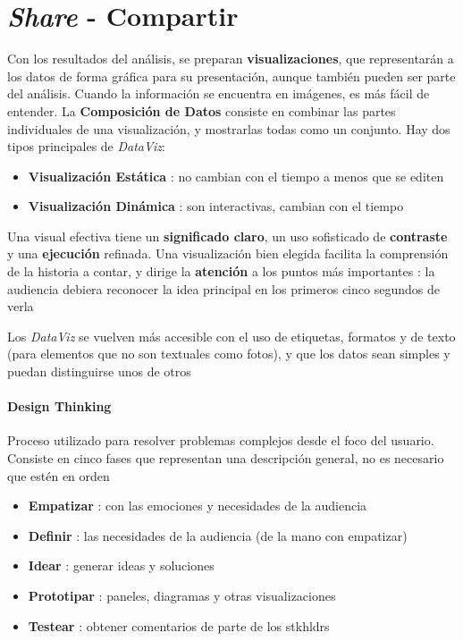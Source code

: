 
\section{\textit{Share} - Compartir}
Con los resultados del análisis, se preparan \textbf{visualizaciones}, que representarán a los datos de forma gráfica para su presentación, aunque también pueden ser parte del análisis. Cuando la información se encuentra en imágenes, es más fácil de entender. La \textbf{Composición de Datos} consiste en combinar las partes individuales de una visualización, y mostrarlas todas como un conjunto. Hay dos tipos principales de \textit{DataViz}:
\begin{itemize}
    \item {\textbf{Visualización Estática} : no cambian con el tiempo a menos que se editen}
    \item {\textbf{Visualización Dinámica} : son interactivas, cambian con el tiempo}
\end{itemize}
Una visual efectiva tiene un \textbf{significado claro}, un uso sofisticado de \textbf{contraste} y una \textbf{ejecución} refinada. Una visualización bien elegida facilita la comprensión de la historia a contar, y dirige la \textbf{atención} a los puntos más importantes : la audiencia debiera reconocer la idea principal en los primeros cinco segundos de verla

Los \textit{DataViz} se vuelven más accesible con el uso de etiquetas, formatos y de texto (para elementos que no son textuales como fotos), y que los datos sean simples y puedan distinguirse unos de otros

\paragraph{Design Thinking}
Proceso utilizado para resolver problemas complejos desde el foco del usuario. Consiste en cinco fases que representan una descripción general, no es necesario que estén en orden
\begin{itemize}
    \item {\textbf{Empatizar} : con las emociones y necesidades de la audiencia}
    \item {\textbf{Definir} : las necesidades de la audiencia (de la mano con empatizar)}
    \item {\textbf{Idear} : generar ideas y soluciones} 
    \item {\textbf{Prototipar} : paneles, diagramas y otras visualizaciones}
    \item {\textbf{Testear} : obtener comentarios de parte de los \gls{stkhldrs}}
\end{itemize}

